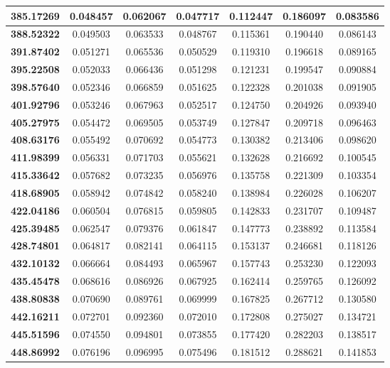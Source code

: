 \documentclass[11pt]{article}
\begin{document}
\begin{appendices}
\begin{longtable}{|c|c|c|c|c|c|c|}
	\textbf{385.17269} & 0.048457 & 0.062067 & 0.047717 & 0.112447 & 0.186097 & 0.083586 \\ \hline
	\textbf{388.52322} & 0.049503 & 0.063533 & 0.048767 & 0.115361 & 0.190440 & 0.086143 \\ \hline
	\textbf{391.87402} & 0.051271 & 0.065536 & 0.050529 & 0.119310 & 0.196618 & 0.089165 \\ \hline
	\textbf{395.22508} & 0.052033 & 0.066436 & 0.051298 & 0.121231 & 0.199547 & 0.090884 \\ \hline
	\textbf{398.57640} & 0.052346 & 0.066859 & 0.051625 & 0.122328 & 0.201038 & 0.091905 \\ \hline
	\textbf{401.92796} & 0.053246 & 0.067963 & 0.052517 & 0.124750 & 0.204926 & 0.093940 \\ \hline
	\textbf{405.27975} & 0.054472 & 0.069505 & 0.053749 & 0.127847 & 0.209718 & 0.096463 \\ \hline
	\textbf{408.63176} & 0.055492 & 0.070692 & 0.054773 & 0.130382 & 0.213406 & 0.098620 \\ \hline
	\textbf{411.98399} & 0.056331 & 0.071703 & 0.055621 & 0.132628 & 0.216692 & 0.100545 \\ \hline
	\textbf{415.33642} & 0.057682 & 0.073235 & 0.056976 & 0.135758 & 0.221309 & 0.103354 \\ \hline
	\textbf{418.68905} & 0.058942 & 0.074842 & 0.058240 & 0.138984 & 0.226028 & 0.106207 \\ \hline
	\textbf{422.04186} & 0.060504 & 0.076815 & 0.059805 & 0.142833 & 0.231707 & 0.109487 \\ \hline
	\textbf{425.39485} & 0.062547 & 0.079376 & 0.061847 & 0.147773 & 0.238892 & 0.113584 \\ \hline
	\textbf{428.74801} & 0.064817 & 0.082141 & 0.064115 & 0.153137 & 0.246681 & 0.118126 \\ \hline
	\textbf{432.10132} & 0.066664 & 0.084493 & 0.065967 & 0.157743 & 0.253230 & 0.122093 \\ \hline
	\textbf{435.45478} & 0.068616 & 0.086926 & 0.067925 & 0.162414 & 0.259765 & 0.126092 \\ \hline
	\textbf{438.80838} & 0.070690 & 0.089761 & 0.069999 & 0.167825 & 0.267712 & 0.130580 \\ \hline
	\textbf{442.16211} & 0.072701 & 0.092360 & 0.072010 & 0.172808 & 0.275027 & 0.134721 \\ \hline
	\textbf{445.51596} & 0.074550 & 0.094801 & 0.073855 & 0.177420 & 0.282203 & 0.138517 \\ \hline
	\textbf{448.86992} & 0.076196 & 0.096995 & 0.075496 & 0.181512 & 0.288621 & 0.141853 \\ \hline

\end{longtable}
\end{appendices}
\end{document}
